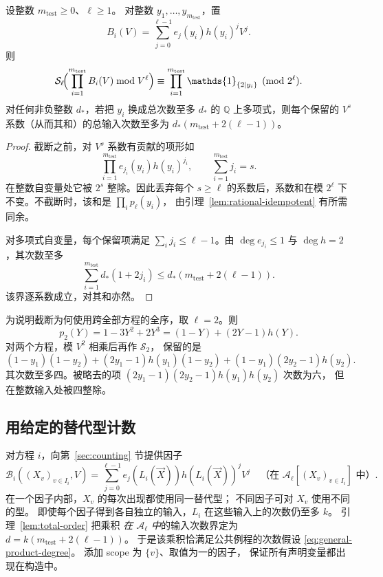 \begin{lemma}\label{lem:total-order}
设整数 $m_{\mathrm{test}}\ge0$、$\ell\ge1$。
对整数 $y_1,\ldots,y_{m_{\mathrm{test}}}$，置
\[
 B_i(V)=\sum_{j=0}^{\ell-1}e_j(y_i)h(y_i)^jV^j.
\]
则
\[
 \mathcal S_\ell\!\Bigl(\prod_{i=1}^{m_{\mathrm{test}}} B_i(V)\bmod V^\ell\Bigr)
 \equiv\prod_{i=1}^{m_{\mathrm{test}}}\mathds{1}_{\{2\mid y_i\}}\pmod{2^\ell}.
\]
对任何非负整数 $d_*$，若把 $y_i$ 换成总次数至多 $d_*$
的 $\mathbb Q$ 上多项式，则每个保留的 $V^s$
系数（从而其和）的总输入次数至多为
$d_*(m_{\mathrm{test}}+2(\ell-1))$。
\end{lemma}
\begin{proof}
截断之前，对 $V^s$ 系数有贡献的项形如
\[
 \prod_{i=1}^{m_{\mathrm{test}}} e_{j_i}(y_i)h(y_i)^{j_i},
 \qquad \sum_{i=1}^{m_{\mathrm{test}}} j_i=s.
\]
在整数自变量处它被 $2^s$ 整除。因此丢弃每个
$s\ge\ell$ 的系数后，系数和在模 $2^\ell$
下不变。不截断时，该和是 $\prod_i p_\ell(y_i)$，
由引理~\ref{lem:rational-idempotent} 有所需同余。

对多项式自变量，每个保留项满足
$\sum_i j_i\le\ell-1$。由 $\deg e_{j_i}\le1$
与 $\deg h=2$，其次数至多
\[
 \sum_{i=1}^{m_{\mathrm{test}}} d_*(1+2j_i)
 \le d_*(m_{\mathrm{test}}+2(\ell-1)).
\]
该界逐系数成立，对其和亦然。
\end{proof}

为说明截断为何使用跨全部方程的全序，取 $\ell=2$。则
\[
 p_2(Y)=1-3Y^2+2Y^3=(1-Y)+(2Y-1)h(Y).
\]
对两个方程，模 $V^2$ 相乘后再作 $\mathcal S_2$，
保留的是
\[
 (1-y_1)(1-y_2)
 +(2y_1-1)h(y_1)(1-y_2)
 +(1-y_1)(2y_2-1)h(y_2).
\]
其次数至多四。被略去的项
$(2y_1-1)(2y_2-1)h(y_1)h(y_2)$ 次数为六，
但在整数输入处被四整除。

\subsection{用给定的替代型计数}\label{subsec:count-polynomial}
对方程 $i$，向第~\ref{sec:counting} 节提供因子
\begin{equation}\label{eq:lifted-factor}
 \mathcal B_i((X_v)_{v\in I_i},V)
 =\sum_{j=0}^{\ell-1}e_j(L_i(\vec X))h(L_i(\vec X))^j V^j
 \quad\text{（在 }\mathcal A_\ell[(X_v)_{v\in I_i}]\text{ 中）}.
\end{equation}
在一个因子内部，$X_v$ 的每次出现都使用同一替代型；
不同因子可对 $X_v$ 使用不同的型。
即使每个因子得到各自独立的输入，$L_i$
在这些输入上的次数仍至多 $k$。
引理~\ref{lem:total-order} 把乘积
\emph{在 $\mathcal A_\ell$ 中}的输入次数界定为
$d=k(m_{\mathrm{test}}+2(\ell-1))$。
于是该乘积恰满足公共例程的次数假设
\eqref{eq:general-product-degree}。
添加 scope 为 $\{v\}$、取值为一的因子，
保证所有声明变量都出现在构造中。


